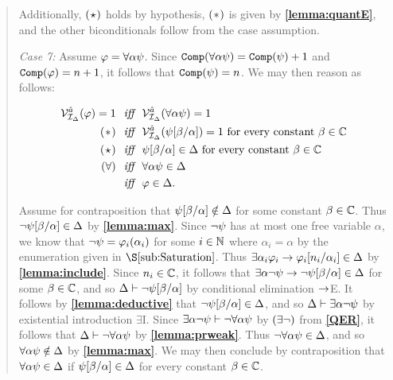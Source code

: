 \begin{quote}
  Additionally, $(\hspace{.7pt}\star\hspace{.7pt})$ holds by hypothesis, $(\hspace{.7pt}\ast\hspace{.7pt})$ is given by \textbf{\ref{lemma:quantE}}, and the other biconditionals follow from the case assumption.

  \textit{Case 7:}
  Assume $\varphi=\forall \alpha\psi$.
  Since $\texttt{Comp}(\forall \alpha\psi)=\texttt{Comp}(\psi)+1$ and $\texttt{Comp}(\varphi)=n+1$, it follows that $\texttt{Comp}(\psi)=n$.
  We may then reason as follows:

  \vspace{-.2in}
  \begin{align*}
    \mathcal{V}_{\mathcal{I}_{\Delta}}^{\hat{a}}(\varphi)=1 &\textit{ ~iff~ } \mathcal{V}_{\mathcal{I}_{\Delta}}^{\hat{a}}(\forall \alpha\psi)=1\\
      (\hspace{.7pt}\ast\hspace{.7pt}) &\textit{ ~iff~ } \mathcal{V}_{\mathcal{I}_{\Delta}}^{\hat{a}}(\psi[\beta/\alpha])=1 \text{ for every constant } \beta\in\mathbb{C}\\
      (\hspace{.7pt}\star\hspace{.7pt}) &\textit{ ~iff~ } \psi[\beta/\alpha]\in\Delta \text{ for every constant } \beta\in\mathbb{C}\\ 
      (\forall) &\textit{ ~iff~ } \forall \alpha\psi\in\Delta \\
      &\textit{ ~iff~ } \varphi\in\Delta.
  \end{align*}

  Assume for contraposition that $\psi[\beta/\alpha]\notin\Delta$ for some constant $\beta\in\mathbb{C}$.
  Thus $\neg\psi[\beta/\alpha]\in\Delta$ by \textbf{\ref{lemma:max}}.
  Since $\neg\psi$ has at most one free variable $\alpha$, we know that $\neg\psi=\varphi_i(\alpha_i)$ for some $i\in\mathbb{N}$ where $\alpha_i=\alpha$ by the enumeration given in $\S\ref{sub:Saturation}$.
  Thus $\exists \alpha_i\varphi_i\rightarrow\varphi_i[n_i/\alpha_i]\in\Delta$ by \textbf{\ref{lemma:include}}.
  Since $n_i\in\mathbb{C}$, it follows that $\exists \alpha\neg\psi\rightarrow\neg\psi[\beta/\alpha]\in\Delta$ for some $\beta\in\mathbb{C}$, and so $\Delta\vdash\neg\psi[\beta/\alpha]$ by conditional elimination $\rightarrow$E. 
  It follows by \textbf{\ref{lemma:deductive}} that $\neg\psi[\beta/\alpha]\in\Delta$, and so $\Delta\vdash \exists \alpha\neg\psi$ by existential introduction $\exists$I. 
  Since $\exists \alpha\neg\psi\vdash\neg\forall \alpha\psi$ by $(\exists\neg)$ from \textbf{\ref{QER}}, it follows that $\Delta\vdash\neg \forall \alpha\psi$ by \textbf{\ref{lemma:prweak}}. 
  Thus $\neg\forall \alpha\psi\in\Delta$, and so $\forall \alpha\psi\notin\Delta$ by \textbf{\ref{lemma:max}}.
  We may then conclude by contraposition that $\forall \alpha\psi\in\Delta$ if $\psi[\beta/\alpha]\in\Delta$ for every constant $\beta\in\mathbb{C}$.


\end{quote}
